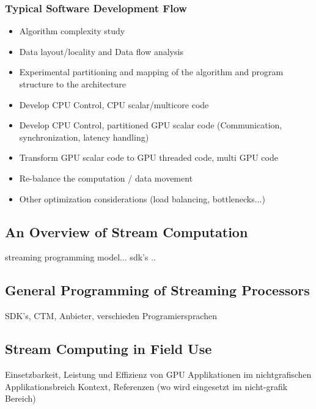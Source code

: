 \subsubsection{Typical Software Development Flow} %
\label{ssub:typical_software_development_flow}
\begin{itemize}
	\item Algorithm complexity study
	\item Data layout/locality and Data flow analysis
	\item Experimental partitioning and mapping of the algorithm and program 
		structure to the architecture
	\item Develop CPU Control, CPU scalar/multicore code
	\item Develop CPU Control, partitioned GPU scalar code (Communication, 
		synchronization, latency handling)
	\item Transform GPU scalar code to GPU threaded code, multi GPU code
	\item Re-balance the computation / data movement
	\item Other optimization considerations (load balancing, bottlenecks...)
\end{itemize}


\subsection{An Overview of Stream Computation} %
\label{sub:an_overview_of_stream_computation}
streaming programming model... sdk's .. 

\subsection{General Programming of Streaming Processors} %
\label{sub:programming_streaming_processors}
SDK's, CTM, Anbieter, verschieden Programiersprachen

\subsection{Stream Computing in Field Use} %
\label{sub:stream_computing_in_use}
Einsetzbarkeit, Leistung und Effizienz von GPU Applikationen im nichtgrafischen Applikationsbreich Kontext, Referenzen (wo wird eingesetzt im nicht-grafik
Bereich)

